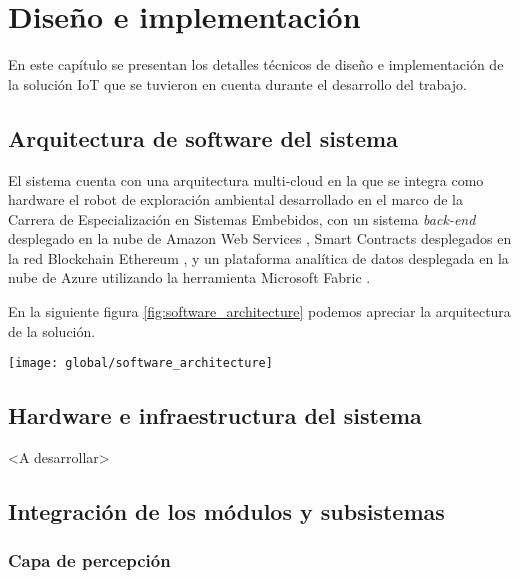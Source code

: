 \chapter{Diseño e implementación} %

\label{Chapter3} %

En este capítulo se presentan los detalles técnicos de diseño e implementación de la solución IoT que se tuvieron en cuenta durante el desarrollo del trabajo.


\section{Arquitectura de software del sistema}


El sistema cuenta con una arquitectura multi-cloud en la que se integra como hardware el robot de exploración ambiental \citep{cese_gonzalo_memoria} desarrollado en el marco de la Carrera de Especialización en Sistemas Embebidos, con un sistema \textit{back-end} desplegado en la nube de Amazon Web Services \citep{aws}, Smart Contracts desplegados en la red Blockchain Ethereum \cite{ethereum}, y un plataforma analítica de datos desplegada en la nube de Azure \cite{azure} utilizando la herramienta Microsoft Fabric \cite{azure_fabric}. 


En la siguiente figura \ref{fig:software_architecture} podemos apreciar la arquitectura de la solución.


\begin{center}
   \texttt{[image: global/software\_architecture]}
   \label{fig:software_architecture}
\end{center}

\section{Hardware e infraestructura del sistema}
 
<A desarrollar>
 
\section{Integración de los módulos y subsistemas}




\subsection{Capa de percepción}


